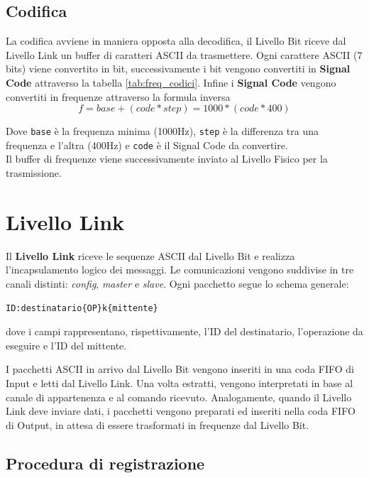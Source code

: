 \subsection{Codifica}
La codifica avviene in maniera opposta alla decodifica, il Livello Bit riceve dal Livello Link un buffer di caratteri ASCII da trasmettere.
Ogni carattere ASCII (7 bits) viene convertito in bit, successivamente i bit vengono convertiti in \textbf{Signal Code} attraverso la tabella \ref{tab:freq_codici}.
Infine i \textbf{Signal Code} vengono convertiti in frequenze attraverso la formula inversa
\begin{equation}
f = base + (code*step) = 1000 * (code*400)
\end{equation}

Dove \texttt{base} è la frequenza minima (1000Hz), \texttt{step} è la differenza tra una frequenza e l'altra (400Hz) e \texttt{code} è il Signal Code da convertire.\\

Il buffer di frequenze viene successivamente inviato al Livello Fisico per la trasmissione.

\section{Livello Link}
\label{sec:livello_link}

Il \textbf{Livello Link} riceve le sequenze ASCII dal Livello Bit e realizza l’incapsulamento logico dei messaggi. 
Le comunicazioni vengono suddivise in tre canali distinti: \emph{config}, \emph{master} e \emph{slave}. 
Ogni pacchetto segue lo schema generale:

\begin{verbatim}
ID:destinatario{OP}k{mittente}
\end{verbatim}

dove i campi rappresentano, rispettivamente, l’ID del destinatario, l’operazione da eseguire e l’ID del mittente.  

I pacchetti ASCII in arrivo dal Livello Bit vengono inseriti in una coda FIFO di Input e letti dal Livello Link. 
Una volta estratti, vengono interpretati in base al canale di appartenenza e al comando ricevuto. 
Analogamente, quando il Livello Link deve inviare dati, i pacchetti vengono preparati ed inseriti nella coda FIFO di Output, in attesa di essere trasformati in frequenze dal Livello Bit.

\subsection{Procedura di registrazione}

